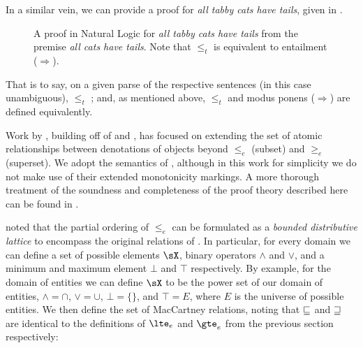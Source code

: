 In a similar vein, we can provide a proof for \textit{all tabby cats
  have tails}, given in .

\begin{figure*}
  \begin{prooftree}
  \end{prooftree}
\caption{\label{fig:catsproof}
  A proof in Natural Logic for \textit{all tabby cats have tails} from
    the premise \textit{all cats have tails}.
  Note that $\le_t$ is equivalent to entailment ($\Rightarrow$).
} 
\end{figure*}

That is to say, on a given parse of the respective sentences (in this
  case unambiguous),
   $\leq_t$ ;
  and, as mentioned above, $\leq_t$ and modus ponens ($\Rightarrow$)
  are defined equivalently.


Work by , building off of
   and
  ,
  has focused on extending the set of atomic relationships between
  denotations of objects beyond $\leq_e$ (subset) and $\geq_e$ (superset).
We adopt the semantics of , although in this
  work for simplicity we do not make use of their extended
  monotonicity markings.
A more thorough treatment of the soundness and completeness of the
  proof theory described here can be found in
  .

 noted that the partial ordering of
  $\leq_e$ can be formulated as a \textit{bounded distributive
  lattice} to encompass the original relations of
  .
In particular, for every domain we can define a set of possible 
  elements $\sX$, binary operators $\land$ and $\lor$,
  and a minimum and maximum element $\bot$ and $\top$ respectively.
By example, for the domain of entities we can define $\sX$ to be
  the power set of our domain of entities, $\land=\cap$,
  $\lor=\cup$, $\bot=\{\}$, and $\top=E$, where $E$ is the universe
  of possible entities.
We then define the set of MacCartney relations, noting that
  $\forward$ and $\reverse$ are identical to the definitions of
  $\lte_e$ and $\gte_e$ from the previous section respectively:

